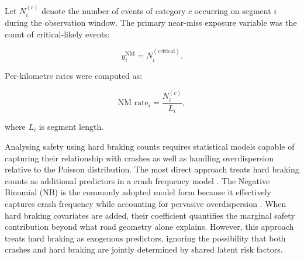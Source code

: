 \documentclass[letterpaper,8pt]{extarticle}  %
\begin{document}
\begin{doublespacing}
\begin{linenumbers}
Let $N_i^{(c)}$ denote the number of events of category $c$ occurring on segment $i$ during the observation window. The primary near-miss exposure variable was the count of critical-likely events:

\begin{equation}
y^{\text{NM}}_i = N_i^{(\text{critical})}.
\end{equation}

Per-kilometre rates were computed as:

\begin{equation}
\text{NM rate}_i = \frac{N_i^{(c)}}{L_i},
\end{equation}

where $L_i$ is segment length.



Analysing safety using hard braking counts requires statistical models
capable of capturing their relationship with crashes as well as handling overdispersion relative to the Poisson distribution.  The most direct approach treats hard braking counts as additional predictors in a crash frequency model \citep{Miaou1993ModelingRelationships}. The  Negative Binomial
(NB) is the commonly adopted model form because it effectively captures crash frequency while accounting for pervasive overdispersion \citep{Lord2010TheAlternatives}. When hard braking covariates are
added, their coefficient quantifies the marginal safety contribution beyond what road geometry alone explains. However, this approach treats hard braking as exogenous predictors, ignoring
the possibility that both crashes and  hard braking are jointly determined by
shared latent risk factors. 


\end{linenumbers}
\end{doublespacing}
\end{document}
